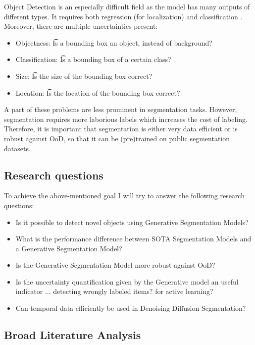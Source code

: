 Object Detection is an especially difficult field as the model has many outputs of different types. It requires both regression (for localization) and classification \cite{Gasperini_2022}. Moreover, there are multiple uncertainties present:
\begin{itemize}
    \item Objectness: \t Is a bounding box an object, instead of background?  \label{prop:Objectness}
    \item Classification: \t Is a bounding box of a certain class? \label{prop:Classification}
    \item Size: \t Is the size of the bounding box correct? \label{prop:Size}
    \item Location: \t Is the location of the bounding box correct? \label{prop:Location}
\end{itemize}
A part of these problems are less prominent in segmentation tasks. However, segmentation requires more laborious labels which increases the cost of labeling. Therefore, it is important that segmentation is either very data efficient or is robust against OoD, so that it can be (pre)trained on public segmentation datasets.

\subsection{Research questions}
To achieve the above-mentioned goal I will try to answer the following research questions:

\begin{itemize}
    \item Is it possible to detect novel objects using Generative Segmentation Models?
    \item What is the performance difference between SOTA Segmentation Models and a Generative Segmentation Model?
    \item Is the Generative Segmentation Model more robust against OoD?
    \item Is the uncertainty quantification given by the Generative model an useful indicator ...
          \subitem detecting wrongly labeled items?
          \subitem for active learning?
    \item Can temporal data efficiently be used in Denoising Diffusion Segmentation?
\end{itemize}

\subsection{Broad Literature Analysis}\label{sec:broadliterature}

